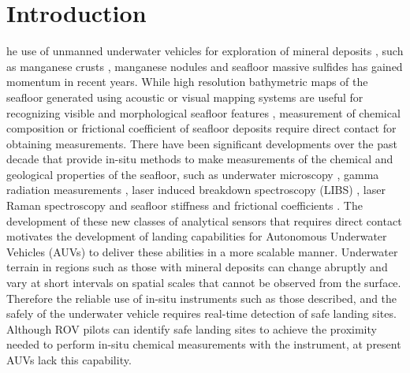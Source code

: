 \section{Introduction}

he use of unmanned underwater vehicles for exploration of mineral deposits \cite{Suzuki2015}, such as manganese crusts \cite{Usui2016}, manganese nodules \cite{Schoening2016} and seafloor massive sulfides \cite{Thornton2016} has gained momentum in recent years. While high resolution bathymetric maps of the seafloor generated using acoustic \cite{Moustier1993} or visual \cite{Roman2010} mapping systems are useful for recognizing visible and morphological seafloor features \cite{Pizarro2009}\cite{Maki2010}, measurement of chemical composition \cite{Takahashi2015} or frictional coefficient \cite{White2011} of seafloor deposits require direct contact for obtaining measurements. There have been significant developments over the past decade that provide in-situ methods to make measurements of the chemical and geological properties of the seafloor, such as underwater microscopy \cite{Rubin2007}, gamma radiation measurements \cite{Thornton2013a}\cite{Thornton2013}, laser induced breakdown spectroscopy (LIBS) \cite{Thornton2015}\cite{Saeki2014}, laser Raman spectroscopy \cite{Brewer2004}\cite{Pasteris2004} and seafloor stiffness and frictional coefficients \cite{Stanier2015}. The development of these new classes of analytical sensors that requires direct contact motivates the development of landing capabilities for Autonomous Underwater Vehicles (AUVs) to deliver these abilities in a more scalable manner. Underwater terrain in regions such as those with mineral deposits can change abruptly and vary at short intervals on spatial scales that cannot be observed from the surface. Therefore the reliable use of in-situ instruments such as those described, and the safely of the underwater vehicle requires real-time detection of safe landing sites. Although ROV pilots can identify safe landing sites to achieve the proximity needed to perform in-situ chemical measurements with the instrument, at present AUVs lack this capability. 

